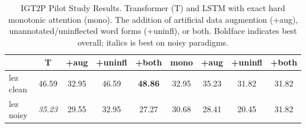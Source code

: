\begin{table}[t]
\centering
    \begin{tabular}{l|cccc|cccc}
      \textbf{} & \textbf{T} & \textbf{+aug} & \textbf{+uninfl} & \textbf{+both} & \textbf{mono} &  \textbf{+aug} &
      \textbf{+uninfl} &
      \textbf{+both} \\
      \hline
      lez clean & 46.59 & 32.95 & 46.59 & \textbf{48.86} & 32.95 & 35.23 & 31.82 & 31.82 \\
      lez noisy & \textit{35.23} & 29.55 & 32.95 & 27.27 & 30.68 & 28.41 & 20.45 & 31.82 \\
    \end{tabular}
    \caption[IGT2P Pilot Study Results]{IGT2P Pilot Study Results. Transformer (T) and LSTM with exact hard monotonic attention (mono). The addition of artificial data augmention (+aug), unannotated/uninflected word forms (+uninfl), or both. Boldface indicates best overall; italics is best on noisy paradigms.}
    \label{tab:IGT2Presults}
\end{table}
 
